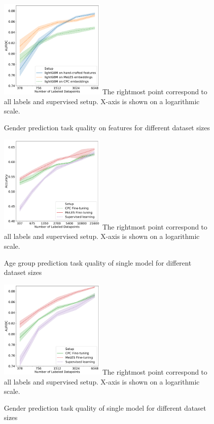 \documentclass[sigconf, anonymous]{acmart}
\begin{document}
\begin{figure}[h]
  \caption{Gender prediction task quality on features for different dataset sizes}
  \includegraphics[width=0.46\textwidth]{figures/ss_gen_0.pdf}
  \small{The rightmost point correspond to all labels and supervised setup. X-axis is shown on a logarithmic scale.}
  \label{fig-semi-gender-0}
\end{figure}

\begin{figure}[h]
  \caption{Age group prediction task quality of single model for different dataset sizes}
  \includegraphics[width=0.46\textwidth]{figures/ss_age_1_wopl.pdf}
  \small{The rightmost point correspond to all labels and supervised setup. X-axis is shown on a logarithmic scale.}
  \label{fig-semi-age-1}
\end{figure}

\begin{figure}[h]
  \caption{Gender prediction task quality of single model for different dataset sizes}
  \includegraphics[width=0.46\textwidth]{figures/ss_gen_1.pdf}
  \small{The rightmost point correspond to all labels and supervised setup. X-axis is shown on a logarithmic scale.}
  \label{fig-semi-gender-1}
\end{figure}
\end{document}
